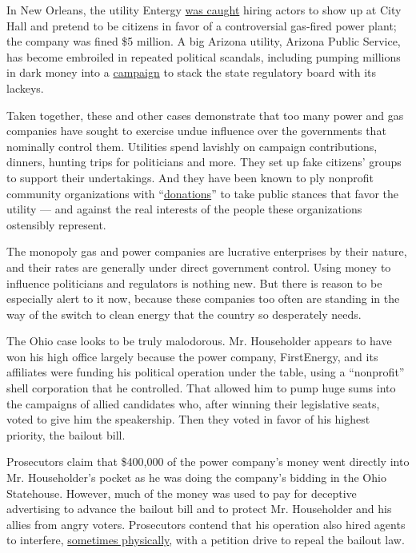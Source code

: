 In New Orleans, the utility Entergy
\href{https://www.nola.com/news/article_f2266bc6-6458-5b14-87d5-c1e628650210.html}{was
caught} hiring actors to show up at City Hall and pretend to be citizens
in favor of a controversial gas-fired power plant; the company was fined
\$5 million. A big Arizona utility, Arizona Public Service, has become
embroiled in repeated political scandals, including pumping millions in
dark money into a
\href{https://www.azcentral.com/story/money/business/energy/2019/03/29/arizona-public-service-admits-spending-millions-2014-corporation-commission-races/3317121002/}{campaign}
to stack the state regulatory board with its lackeys.

Taken together, these and other cases demonstrate that too many power
and gas companies have sought to exercise undue influence over the
governments that nominally control them. Utilities spend lavishly on
campaign contributions, dinners, hunting trips for politicians and more.
They set up fake citizens' groups to support their undertakings. And
they have been known to ply nonprofit community organizations with
``\href{https://www.energyandpolicy.org/strings-attached-how-utilities-use-charitable-giving-to-influence-politics-increase-investor-profits/}{donations}''
to take public stances that favor the utility --- and against the real
interests of the people these organizations ostensibly represent.

The monopoly gas and power companies are lucrative enterprises by their
nature, and their rates are generally under direct government control.
Using money to influence politicians and regulators is nothing new. But
there is reason to be especially alert to it now, because these
companies too often are standing in the way of the switch to clean
energy that the country so desperately needs.

The Ohio case looks to be truly malodorous. Mr. Householder appears to
have won his high office largely because the power company, FirstEnergy,
and its affiliates were funding his political operation under the table,
using a ``nonprofit'' shell corporation that he controlled. That allowed
him to pump huge sums into the campaigns of allied candidates who, after
winning their legislative seats, voted to give him the speakership. Then
they voted in favor of his highest priority, the bailout bill.

Prosecutors claim that \$400,000 of the power company's money went
directly into Mr. Householder's pocket as he was doing the company's
bidding in the Ohio Statehouse. However, much of the money was used to
pay for deceptive advertising to advance the bailout bill and to protect
Mr. Householder and his allies from angry voters. Prosecutors contend
that his operation also hired agents to interfere,
\href{https://www.cleveland.com/open/2019/09/house-bill-6-campaign-worker-charged-over-confrontation-with-repeal-campaign-worker.html}{sometimes
physically}, with a petition drive to repeal the bailout law.


